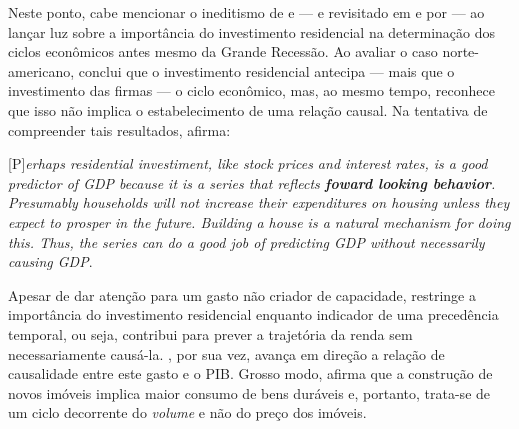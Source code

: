 Neste ponto, cabe mencionar o ineditismo de \textcite{green_follow_1997} e \textcite{leamer_housing_2007} --- e revisitado em \textcite{leamer_housing_2015} e por \textcite{fiebiger_trend_2017} --- ao lançar luz sobre a importância do investimento residencial na determinação dos ciclos econômicos antes mesmo da Grande Recessão. 
Ao avaliar o caso norte-americano, \textcite{green_follow_1997} conclui que o
investimento residencial antecipa --- mais que o investimento das firmas --- o ciclo econômico, mas, ao mesmo tempo, reconhece que isso não implica o estabelecimento de uma relação causal. Na tentativa de compreender tais resultados, afirma:

\begin{citacao}
	
	[P]\textit{erhaps residential investiment, like stock prices and interest rates, is a good predictor of GDP because it is a series that reflects \textbf{foward looking behavior}. Presumably households will not increase their expenditures on housing unless they expect to prosper in the future. Building a house is a natural mechanism for doing this. Thus, the series can do a good job of predicting GDP without necessarily causing GDP}.
	\cite[p.~267, grifos adicionados]{green_follow_1997}
\end{citacao}
Apesar de dar atenção para um gasto não criador de capacidade, \textcite{green_follow_1997} restringe a importância do investimento residencial enquanto indicador de uma precedência temporal, ou seja, contribui para prever a trajetória da renda sem necessariamente causá-la.
\textcite{leamer_housing_2007}, por sua vez, avança em direção a relação de causalidade entre este gasto e o PIB. Grosso modo, afirma que a construção de novos imóveis implica maior consumo de bens duráveis e, portanto, trata-se de um ciclo decorrente do \textit{volume} e não do preço dos imóveis. 

